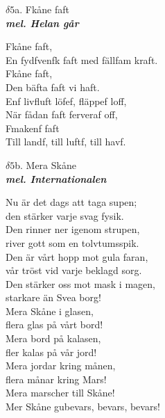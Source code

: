 \documentclass[a6paper,10pt]{article}
\newcommand{\mel}[1]{\small\textbf{\textit{mel. #1 \\}}}
\begin{document}
\setlength{\oddsidemargin}{-0.47in}
\noindent
\begin{center}
\Large $\delta5$a. Fkåne faft\\ 
\mel{Helan går}
\end{center}
Fkåne faft, \\
En fydfvenfk faft med fällfam kraft. \\
Fkåne faft, \\
Den bäfta faft vi haft. 
\vspace{5pt}\\
Enf livfluft löfef, fläppef loff, \\
När fådan faft ferveraf off, \\
Fmakenf faft \\
Till landf, till luftf, till havf. 
\begin{center}
\Large $\delta5$b. Mera Skåne\\ 
\mel{Internationalen}
\end{center}
Nu är det dags att taga supen; \\
den stärker varje svag fysik. \\
Den rinner ner igenom strupen, \\
river gott som en tolvtumsspik. 
\vspace{5pt}\\
Den är vårt hopp mot gula faran, \\
vår tröst vid varje beklagd sorg. \\
Den stärker oss mot mask i magen, \\
starkare än Svea borg! 
\vspace{5pt}\\
Mera Skåne i glasen, \\
flera glas på vårt bord! \\
Mera bord på kalasen, \\
fler kalas på vår jord! \\
Mera jordar kring månen, \\
flera månar kring Mars! \\
Mera marscher till Skåne! \\
Mer Skåne gubevars, bevars, bevars! 
\end{document}
